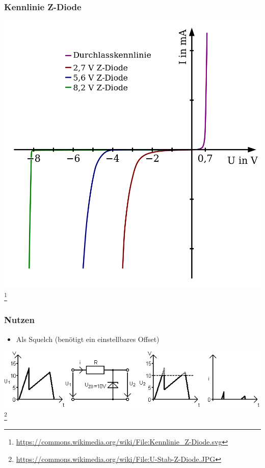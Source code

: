 \begin{frame}
    \frametitle{Kennlinie Z-Diode}
    \begin{center}
        \includegraphics[width=.7\textwidth]{e12/Kennlinie_Z-Diode.png}
        \footnote{\tiny \url{https://commons.wikimedia.org/wiki/File:Kennlinie_Z-Diode.svg}}
	\end{center}
\end{frame}

\begin{frame}
    \frametitle{Nutzen}
      	\begin{itemize}
			\item Als Squelch (benötigt ein einstellbares Offset)
    \end{itemize}    
    \begin{center}
        \includegraphics[width=.8\textwidth]{e12/U-Stab-Z-Diode.jpg}
        \footnote{\tiny \url{https://commons.wikimedia.org/wiki/File:U-Stab-Z-Diode.JPG}}
	\end{center}
\end{frame}

